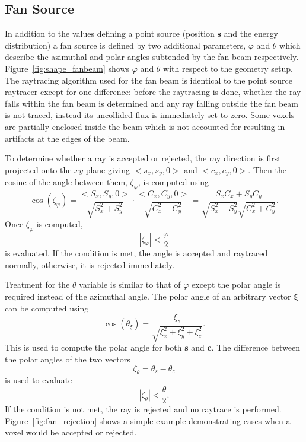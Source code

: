 \subsection{Fan Source}
In addition to the values defining a point source (position $\boldsymbol{s}$ and the energy distribution) a fan source is defined by two additional parameters, $\varphi$ and $\theta$ which describe the azimuthal and polar angles subtended by the fan beam respectively. Figure~\ref{fig:shape_fanbeam} shows $\varphi$ and $\theta$ with respect to the geometry setup. The raytracing algorithm used for the fan beam is identical to the point source raytracer except for one difference: before the raytracing is done, whether the ray falls within the fan beam is determined and any ray falling outside the fan beam is not traced, instead its uncollided flux is immediately set to zero. Some voxels are partially enclosed inside the beam which is not accounted for resulting in artifacts at the edges of the beam.

To determine whether a ray is accepted or rejected, the ray direction is first projected onto the $xy$ plane giving $<s_x, s_y, 0>$ and $<c_x, c_y, 0>$. Then the cosine of the angle between them, $\zeta_\varphi$, is computed using 
\begin{equation}\label{eq:phicos}
\cos(\zeta_\varphi) = \frac{<S_x, S_y, 0>}{\sqrt{S_x^2 + S_y^2}} \cdot \frac{<C_x, C_y, 0>}{\sqrt{C_x^2 + C_y^2}} = \frac{S_x C_x + S_y C_y}{\sqrt{S_x^2 + S_y^2} \sqrt{C_x^2 + C_y^2}}.
\end{equation}
Once $\zeta_\varphi$ is computed,
\begin{equation}\label{eq:phicoscon}
|\zeta_\varphi| < \frac{\varphi}{2}
\end{equation}
is evaluated. If the condition is met, the angle is accepted and raytraced normally, otherwise, it is rejected immediately.

Treatment for the $\theta$ variable is similar to that of $\varphi$ except the polar angle is required instead of the azimuthal angle. The polar angle of an arbitrary vector $\boldsymbol{\xi}$ can be computed using \begin{equation}\label{eq:thetacos}
\cos(\theta_\xi) = \frac{\xi_z}{\sqrt{\xi_x^2 + \xi_y^2 + \xi_z^2}}.
\end{equation}
This is used to compute the polar angle for both $\boldsymbol{s}$ and $\boldsymbol{c}$. The difference between the polar angles of the two vectors 
\begin{equation}\label{eq:thetacos2}
\zeta_\theta = \theta_s - \theta_c
\end{equation}
is used to evaluate
\begin{equation}\label{eq:thetacoscon}
|\zeta_\theta| < \frac{\theta}{2}.
\end{equation}
If the condition is not met, the ray is rejected and no raytrace is performed. Figure~\ref{fig:fan_rejection} shows a simple example demonstrating cases when a voxel would be accepted or rejected.

